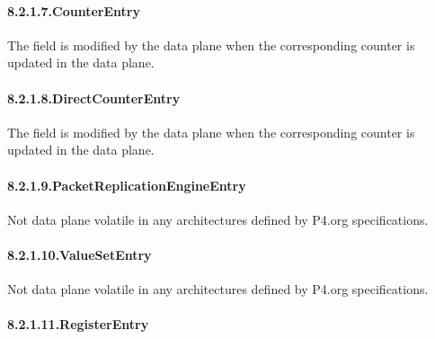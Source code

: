 \documentclass[11pt]{article}
\begin{document}
{%
\paragraph{8.2.1.7.\hspace*{0.5em}CounterEntry}\label{sec-counterentry}%

\noindent{}The field  is modified by the data plane when the corresponding
counter is updated in the data plane.%

\paragraph{8.2.1.8.\hspace*{0.5em}DirectCounterEntry}\label{sec-directcounterentry}%

\noindent{}The field  is modified by the data plane when the corresponding
counter is updated in the data plane.%

\paragraph{8.2.1.9.\hspace*{0.5em}PacketReplicationEngineEntry}\label{sec-packetreplicationengineentry}%

\noindent{}Not data plane volatile in any architectures defined by P4.org
specifications.%

\paragraph{8.2.1.10.\hspace*{0.5em}ValueSetEntry}\label{sec-valuesetentry}%

\noindent{}Not data plane volatile in any architectures defined by P4.org
specifications.%

\paragraph{8.2.1.11.\hspace*{0.5em}RegisterEntry}\label{sec-registerentry}%

}
\end{document}
